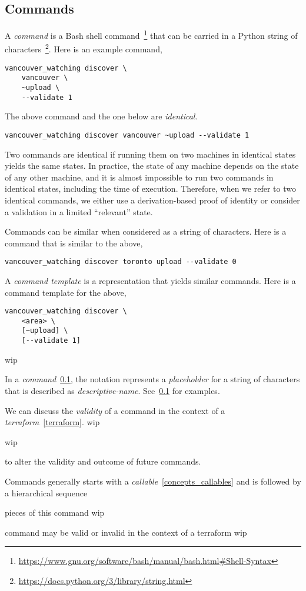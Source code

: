 \subsection{Commands}
\label{commands}

A \emph{command} is a Bash shell command~\footnote{\url{https://www.gnu.org/software/bash/manual/bash.html\#Shell-Syntax}} that can be carried in a Python string of characters~\footnote{\url{https://docs.python.org/3/library/string.html}}. Here is an example command,

\begin{verbatim}
vancouver_watching discover \
    vancouver \
    ~upload \
    --validate 1
\end{verbatim}

The above command and the one below are \emph{identical}.
%
\begin{verbatim}
vancouver_watching discover vancouver ~upload --validate 1
\end{verbatim}
%
Two commands are identical if running them on two machines in identical states yields the same states. In practice, the state of any machine depends on the state of any other machine, and it is almost impossible to run two commands in identical states, including the time of execution. Therefore, when we refer to two identical commands, we either use a derivation-based proof of identity or consider a validation in a limited ``relevant'' state.
 
Commands can be similar when considered as a string of characters. Here is a command that is similar to the above,
%
\begin{verbatim}
vancouver_watching discover toronto upload --validate 0
\end{verbatim}

A \emph{command template} is a representation that yields similar commands. Here is a command template for the above,

\begin{verbatim}
vancouver_watching discover \
    <area> \
    [~upload] \
    [--validate 1]
\end{verbatim}

wip

In a \emph{command}~\ref{commands}, the notation  represents a \emph{placeholder} for a string of characters that is described as \emph{descriptive-name}. See~\ref{commands} for examples.




We can discuss the \emph{validity} of a command in the context of a \emph{terraform}~\ref{terraform}. wip

wip

 to alter the validity and outcome of future commands.

Commands generally starts with a \emph{callable}~\ref{concepts_callables} and is followed by a hierarchical sequence 

pieces of this command wip

command may be valid or invalid in the context of a terraform wip


